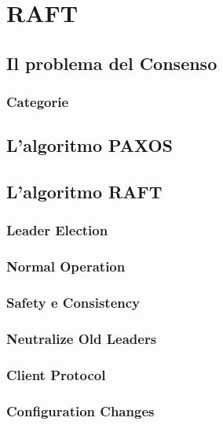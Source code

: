 \chapter{RAFT}
	\section{Il problema del Consenso}
		\subsection{Categorie}
	\section{L'algoritmo PAXOS}
	\section{L'algoritmo RAFT}
		\subsection{Leader Election}
		\subsection{Normal Operation}
		\subsection{Safety e Consistency}
		\subsection{Neutralize Old Leaders}
		\subsection{Client Protocol}
		\subsection{Configuration Changes}